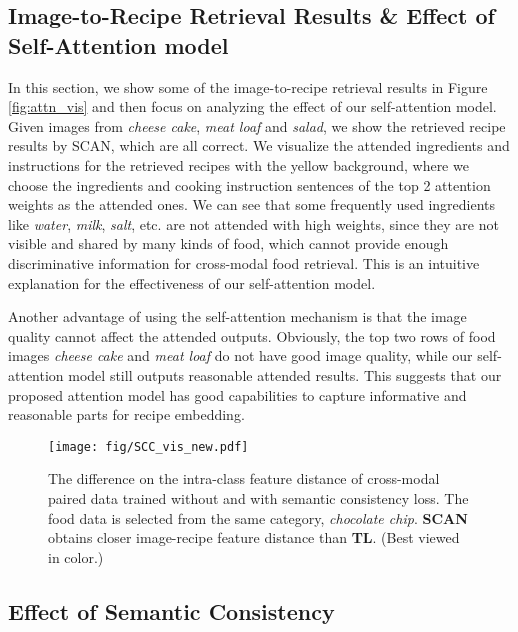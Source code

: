 \documentclass[journal]{IEEEtran}
\begin{document}
\subsection{Image-to-Recipe Retrieval Results \& Effect of Self-Attention model}\label{attention_vis}
In this section, we show some of the image-to-recipe retrieval results in Figure \ref{fig:attn_vis} and then focus on analyzing the effect of our self-attention model. Given images from \emph{cheese cake}, \emph{meat loaf} and \emph{salad}, we show the retrieved recipe results by SCAN, which are all correct. We visualize the attended ingredients and instructions for the retrieved recipes with the yellow background, where we choose the ingredients and cooking instruction sentences of the top 2 attention weights as the attended ones. We can see that some frequently used ingredients like \emph{water}, \emph{milk}, \emph{salt}, etc. are not attended with high weights, since they are not visible and shared by many kinds of food, which cannot provide enough discriminative information for cross-modal food retrieval. This is an intuitive explanation for the effectiveness of our self-attention model. 

Another advantage of using the self-attention mechanism is that the image quality cannot affect the attended outputs. Obviously, the top two rows of food images \emph{cheese cake} and \emph{meat loaf} do not have good image quality, while our self-attention model still outputs reasonable attended results. This suggests that our proposed attention model has good capabilities to capture informative and reasonable parts for recipe embedding. 

\begin{figure}[h!]
\begin{center}
\texttt{[image: fig/SCC\_vis\_new.pdf]}
\end{center}
   \caption{The difference on the intra-class feature distance of cross-modal paired data trained without and with semantic consistency loss. The food data is selected from the same category, \emph{chocolate chip}. \textbf{SCAN} obtains closer image-recipe feature distance than \textbf{TL}. (Best viewed in color.)}
\label{fig:SCC_vis}
\end{figure}

\subsection{Effect of Semantic Consistency}
\end{document}
